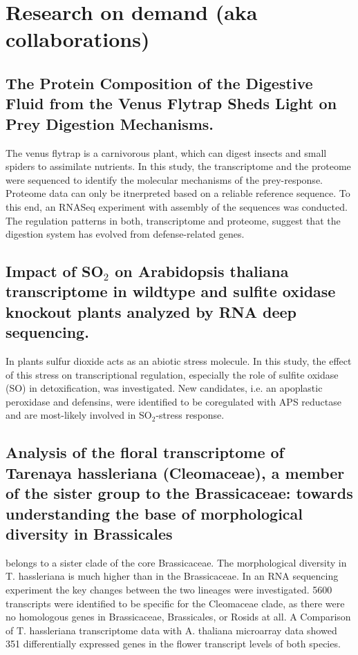 \section{Research on demand (aka collaborations)}
\subsection{The Protein Composition of the Digestive Fluid from the Venus Flytrap Sheds Light on Prey Digestion Mechanisms. \cite{mp_Schulze2012}}
The venus flytrap is a carnivorous plant, which can digest insects and small spiders to assimilate nutrients.
In this study, the transcriptome and the proteome were sequenced to identify the molecular mechanisms of the prey-response.
Proteome data can only be itnerpreted based on a reliable reference sequence.
To this end, an RNASeq experiment with  assembly of the sequences was conducted.
The regulation patterns in both, transcriptome and proteome, suggest that the digestion system has evolved from defense-related genes.

\subsection{Impact of SO$_2$ on Arabidopsis thaliana transcriptome in wildtype and sulfite oxidase knockout plants analyzed by RNA deep sequencing.\cite{mp_Hamisch2012}}
In plants sulfur dioxide acts as an abiotic stress molecule.
In this study, the effect of this stress on transcriptional regulation, especially the role of sulfite oxidase (SO) in detoxification, was investigated.
New candidates, i.e. an apoplastic peroxidase and defensins, were identified to be coregulated with APS reductase and are most-likely involved in SO$_2$-stress response.

\subsection{Analysis of the floral transcriptome of Tarenaya hassleriana (Cleomaceae), a member of the sister group to the Brassicaceae: towards understanding the base of morphological diversity in Brassicales \cite{mp_Bhide2014}}
 belongs to a sister clade of the core Brassicaceae.
The morphological diversity in T. hassleriana is much higher than in the Brassicaceae.
In an RNA sequencing experiment the key changes between the two lineages were investigated.
5600 transcripts were identified to be specific for the Cleomaceae clade, as there were no homologous genes in Brassicaceae, Brassicales, or Rosids at all.
A Comparison of T. hassleriana transcriptome data with A. thaliana microarray data showed 351 differentially expressed genes in the flower transcript levels of both species.


